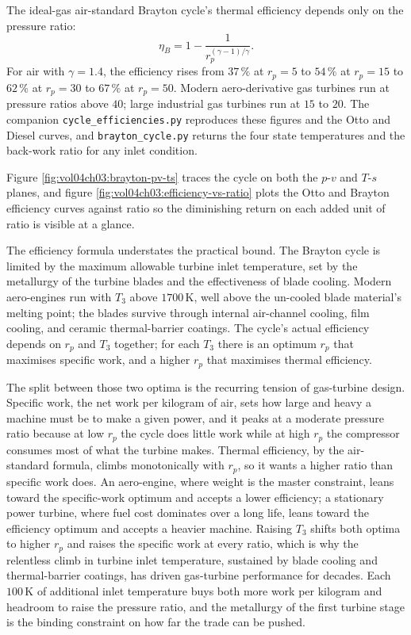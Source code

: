 The ideal-gas air-standard Brayton cycle's thermal efficiency depends
only on the pressure ratio:
\[
\eta_B = 1 - \frac{1}{r_p^{(\gamma-1)/\gamma}}.
\]
For air with $\gamma = 1.4$, the efficiency rises from $37\,\%$ at
$r_p = 5$ to $54\,\%$ at $r_p = 15$ to $62\,\%$ at $r_p = 30$ to $67\,\%$
at $r_p = 50$. Modern aero-derivative gas turbines run at pressure
ratios above $40$; large industrial gas turbines run at $15$ to $20$.
The companion \texttt{cycle\_efficiencies.py} reproduces these figures and
the Otto and Diesel curves, and \texttt{brayton\_cycle.py} returns the four
state temperatures and the back-work ratio for any inlet condition.





Figure \ref{fig:vol04ch03:brayton-pv-ts} traces the cycle on both the
$p$-$v$ and $T$-$s$ planes, and figure \ref{fig:vol04ch03:efficiency-vs-ratio}
plots the Otto and Brayton efficiency curves against ratio so the
diminishing return on each added unit of ratio is visible at a glance.

The efficiency formula understates the practical bound. The Brayton
cycle is limited by the maximum allowable turbine inlet temperature,
set by the metallurgy of the turbine blades and the effectiveness of
blade cooling. Modern aero-engines run with $T_3$ above $1700\,
\si{\kelvin}$, well above the un-cooled blade material's melting
point; the blades survive through internal air-channel cooling, film
cooling, and ceramic thermal-barrier coatings. The cycle's actual
efficiency depends on $r_p$ and $T_3$ together; for each $T_3$ there
is an optimum $r_p$ that maximises specific work, and a higher $r_p$
that maximises thermal efficiency.

The split between those two optima is the recurring tension of
gas-turbine design. Specific work, the net work per kilogram of air, sets
how large and heavy a machine must be to make a given power, and it peaks
at a moderate pressure ratio because at low $r_p$ the cycle does little
work while at high $r_p$ the compressor consumes most of what the turbine
makes. Thermal efficiency, by the air-standard formula, climbs
monotonically with $r_p$, so it wants a higher ratio than specific work
does. An aero-engine, where weight is the master constraint, leans toward
the specific-work optimum and accepts a lower efficiency; a stationary
power turbine, where fuel cost dominates over a long life, leans toward
the efficiency optimum and accepts a heavier machine. Raising $T_3$ shifts
both optima to higher $r_p$ and raises the specific work at every ratio,
which is why the relentless climb in turbine inlet temperature, sustained
by blade cooling and thermal-barrier coatings, has driven gas-turbine
performance for decades. Each $100\,\si{\kelvin}$ of additional inlet
temperature buys both more work per kilogram and headroom to raise the
pressure ratio, and the metallurgy of the first turbine stage is the
binding constraint on how far the trade can be pushed.

